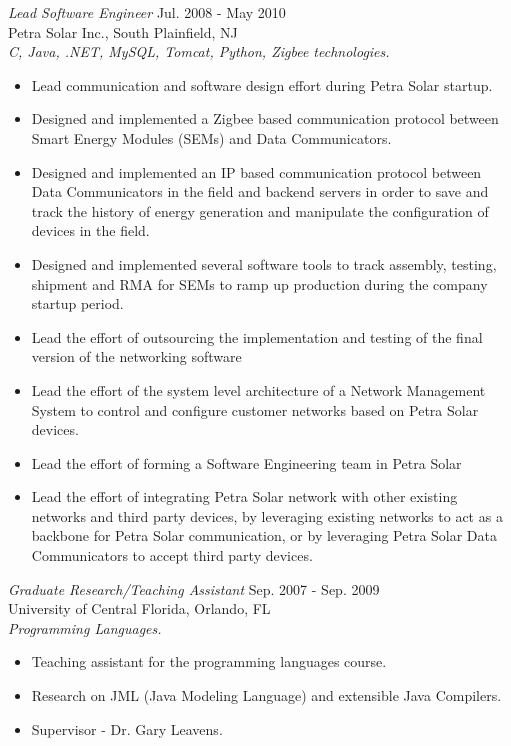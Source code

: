 \documentclass[line,margin]{res}
\begin{document}
\begin{resume}
{\sl Lead Software Engineer} \hfill        Jul. 2008 - May 2010  \\
Petra Solar Inc., South Plainfield, NJ \\
\textit{C, Java, .NET, MySQL, Tomcat, Python, Zigbee technologies.}
\begin{itemize} \itemsep -2pt
     \item  Lead communication and software design effort during Petra Solar
     startup.
     \item  Designed and implemented a Zigbee based communication protocol
     between Smart Energy Modules (SEMs) and Data Communicators.
     \item  Designed and implemented an IP based communication protocol between
     Data Communicators in the field and backend servers in order to save and
     track the history of energy generation and manipulate the configuration of
     devices in the field.
     \item  Designed and implemented several software tools to track assembly,
     testing, shipment and RMA for SEMs to ramp up production during the
     company startup period.
     \item  Lead the effort of outsourcing the implementation and testing of
     the final version of the networking software
     \item  Lead the effort of the system level architecture of a Network
     Management System to control and configure customer networks based on
     Petra Solar devices.
     \item  Lead the effort of forming a Software Engineering team in Petra
     Solar
     \item  Lead the effort of integrating Petra Solar network with other
     existing networks and third party devices, by leveraging existing networks
     to act as a backbone for Petra Solar communication, or by leveraging Petra
     Solar Data Communicators to accept third party devices.
\end{itemize}

{\sl Graduate Research/Teaching Assistant} \hfill   Sep. 2007 - Sep. 2009 \\
University of Central Florida, Orlando, FL \\
\textit{Programming Languages.}
\begin{itemize} \itemsep -2pt
     \item Teaching assistant for the programming languages course.
     \item Research on JML (Java Modeling Language) and extensible Java
     Compilers.
     \item Supervisor - Dr. Gary Leavens.
\end{itemize}


\end{resume}
\end{document}
